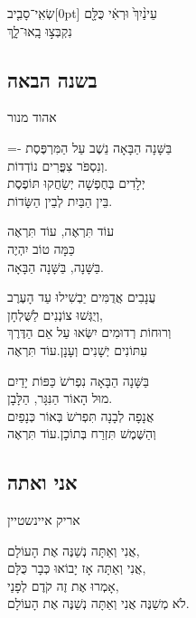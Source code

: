 \documentclass[11pt,twoside]{article}
\newcommand{\instruction}[1]{%
\ifhmode\else\noindent\fi%
{\plain\tiny{#1}}%
}
\newcommand{\mekor}[2][0pt]{\marginnote{\rashi\tiny\scalebox{0.9}[1]{#2}}[#1]}
\newcommand{\isi}[0]{יש׳\xspace}
\begin{document}
{{\mikra שְׂאִֽי־סָבִ֤יב\mekor{\isi מט יח} עֵינַ֨יִךְ֙ וּרְאִ֔י כֻּלָּ֖ם}\\
{\mikra נִקְבְּצ֣וּ בָֽאוּ־לָ֑ךְ}

\newpage

\subsection{בשנה הבאה}
\vspace{-\baselineskip}%
{\centering\instruction{אהוד מנור}\par}
\vspace{0.5\baselineskip}%
{%
\lineskiplimit=-\maxdimen%
בַּשָּׁנָה הַבָּאָה נֵשֶׁב עַל הַמִּרְפֶּסֶת\\
וְנִסְפֹּר צִפֳּרִים נוֹדְדוֹת.\\
יְלָדִים בְּחֻפְשָׁה יְשַׂחֲקוּ תּוֹפֶסֶת\\
בֵּין הַבַּיִת לְבֵין הַשָּׂדוֹת.

{\large%
עוֹד תִּרְאֶה, עוֹד תִּרְאֶה\\
כַּמָּה טוֹב יִהְיֶה\\
בַּשָּׁנָה, בַּשָּׁנָה הַבָּאָה.
}

עֲנָבִים אֲדֻמִּים יַבְשִׁילוּ עַד הָעֶרֶב\\
וְיֻגְּשׁוּ צוֹנְנִים לַשֻּׁלְחָן,\\
וְרוּחוֹת רְדוּמִים יִשְּׂאוּ עַל אֵם הַדֶּרֶךְ\\
עִתּוֹנִים יְשָׁנִים וְעָנָן.\hfill{\scriptsize עוֹד תִּרְאֶה}

בַּשָּׁנָה הַבָּאָה נִפְרֹשֹ כַּפּוֹת יָדַיִם\\
מוּל הָאוֹר הַנִּגָּר, הַלָּבָן.\\
אֲנָפָה לְבָנָה תִּפְרֹשֹ בְּאוֹר כְּנָפַיִם\\
וְהַשֶּׁמֶשׁ תִּזְרַח בְּתוֹכָן.\hfill{\scriptsize עוֹד תִּרְאֶה}\par
}

\vfill%
\subsection{אני ואתה}
\vspace{-\baselineskip}%
{\centering\instruction{אריק איינשטיין}\par}
\vspace{0.5\baselineskip}%
אֲנִי וְאַתָּה נְשַׁנֶּה אֶת הָעוֹלָם,\\
אֲנִי וְאַתָּה אָז יָבוֹאוּ כְּבָר כֻּלָּם,\\
אָמְרוּ אֶת זֶה קֹדֶם לְפָנַי,\\
לֹא מְשַׁנֶּה \textemdash{} אֲנִי וְאַתָּה נְשַׁנֶּה אֶת הָעוֹלָם.

}
\end{document}

